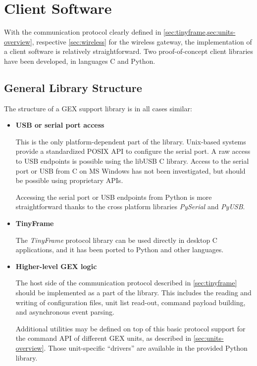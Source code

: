 \chapter{Client Software}

With the communication protocol clearly defined in \cref{sec:tinyframe,sec:units-overview}, respective \cref{sec:wireless} for the wireless gateway, the implementation of a client software is relatively straightforward. Two proof-of-concept client libraries have been developed, in languages C and Python.

\section{General Library Structure}

The structure of a GEX support library is in all cases similar:

\begin{itemize}
	\item \textbf{USB or serial port access}

		This is the only platform-dependent part of the library. Unix-based systems provide a standardized POSIX API to configure the serial port. A raw access to \gls{USB} endpoints is possible using the libUSB C library. Access to the serial port or \gls{USB} from C on MS Windows has not been investigated, but should be possible using proprietary APIs.

		Accessing the serial port or \gls{USB} endpoints from Python is more straightforward thanks to the cross platform libraries \textit{PySerial} and \textit{PyUSB}.

	\item \textbf{TinyFrame}

		The \textit{TinyFrame} protocol library can be used directly in desktop C applications, and it has been ported to Python and other languages.

	\item \textbf{Higher-level GEX logic}

		The host side of the communication protocol described in \cref{sec:tinyframe} should be implemented as a part of the library. This includes the reading and writing of configuration files, unit list read-out, command payload building, and asynchronous event parsing.

		Additional utilities may be defined on top of this basic protocol support for the command API of different GEX units, as described in \cref{sec:units-overview}. Those unit-specific ``drivers'' are available in the provided Python library.
\end{itemize}


